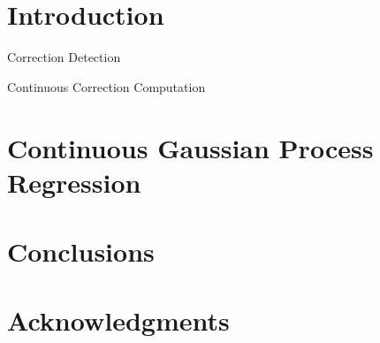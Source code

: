\documentclass[12pt,a4paper]{article}
\newcommand\blankpage{
    \null
    \thispagestyle{empty}
    \newpage}
\begin{document}
\begin{abstract}
There could be some improvements such as optimization of the algorithms (the research of the closest point on many cubic splines can be improved) or developping a concept of showing many times the same correction to the robot to have a better learning, algorithms like putting together many corrections in a 3D space would be developed. However the project is working and the only future work would concern optimization.

\end{abstract}
\clearpage

\newpage
\thispagestyle{empty}
\begin{tableofcontents}
\end{tableofcontents}

\clearpage
\setcounter{page}{1}

\section{Introduction}

\clearpage

\blankpage
\begin{section}{Correction Detection}
\label{section_2}
\end{section}


\clearpage

\begin{section}{Continuous Correction Computation}
\label{section_3}
\end{section}


\clearpage

\blankpage
\section{Continuous Gaussian Process Regression}

\clearpage
\section{Conclusions}

\section{Acknowledgments}


\clearpage

\end{document}

